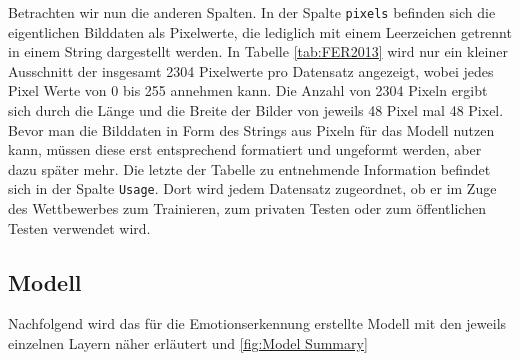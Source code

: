 \documentclass[12pt, a4paper]{report}
\begin{document}
\begin{figure}[h]
\end{figure}
Betrachten wir nun die anderen Spalten. In der Spalte \texttt{pixels} befinden sich die eigentlichen Bilddaten als Pixelwerte, die lediglich mit einem Leerzeichen getrennt in einem String dargestellt werden. In Tabelle \ref{tab:FER2013} wird nur ein kleiner Ausschnitt der insgesamt 2304 Pixelwerte pro Datensatz angezeigt, wobei jedes Pixel Werte von 0 bis 255 annehmen kann. Die Anzahl von 2304 Pixeln ergibt sich durch die Länge und die Breite der Bilder von jeweils 48 Pixel mal 48 Pixel. Bevor man die Bilddaten in Form des Strings aus Pixeln für das Modell nutzen kann, müssen diese erst entsprechend formatiert und ungeformt werden, aber dazu später mehr.  
Die letzte der Tabelle zu entnehmende Information befindet sich in der Spalte \texttt{Usage}. Dort wird jedem Datensatz zugeordnet, ob er im Zuge des Wettbewerbes zum Trainieren, zum privaten Testen oder zum öffentlichen Testen verwendet wird.

\subsection{Modell}
Nachfolgend wird das für die Emotionserkennung erstellte Modell mit den jeweils einzelnen Layern näher erläutert und \ref{fig:Model Summary}
\end{document}
